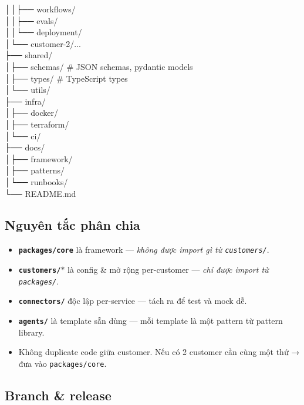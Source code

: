 \documentclass[11pt,a4paper]{article}
\begin{document}
\begin{tcolorbox}[enhanced, colback=codebg, colframe=leaf!40, boxrule=0.5pt,
left=8pt, right=8pt, top=5pt, bottom=5pt, arc=1pt]
│\phantom{xx}│\phantom{xx}├── workflows/\\
│\phantom{xx}│\phantom{xx}├── evals/\\
│\phantom{xx}│\phantom{xx}└── deployment/\\
│\phantom{xx}└── customer-2/...\\
├── shared/\\
│\phantom{xx}├── schemas/               \# JSON schemas, pydantic models\\
│\phantom{xx}├── types/                 \# TypeScript types\\
│\phantom{xx}└── utils/\\
├── infra/\\
│\phantom{xx}├── docker/\\
│\phantom{xx}├── terraform/\\
│\phantom{xx}└── ci/\\
├── docs/\\
│\phantom{xx}├── framework/\\
│\phantom{xx}├── patterns/\\
│\phantom{xx}└── runbooks/\\
└── README.md
\end{tcolorbox}

\subsection{Nguyên tắc phân chia}

\begin{itemize}
\item \textbf{\texttt{packages/core}} là framework --- \textit{không được import gì từ \texttt{customers/}}.
\item \textbf{\texttt{customers/$\ast$}} là config \& mở rộng per-customer --- \textit{chỉ được import từ \texttt{packages/}}.
\item \textbf{\texttt{connectors/}} độc lập per-service --- tách ra để test và mock dễ.
\item \textbf{\texttt{agents/}} là template sẵn dùng --- mỗi template là một pattern từ pattern library.
\item Không duplicate code giữa customer. Nếu có 2 customer cần cùng một thứ → đưa vào \texttt{packages/core}.
\end{itemize}

\subsection{Branch \& release}
\end{document}
